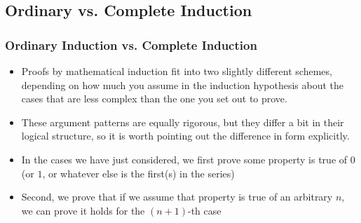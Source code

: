 \subsection{Ordinary vs. Complete Induction}


 \begin{frame}
\frametitle{Ordinary Induction vs. Complete Induction}

\begin{itemize}[<+->]
\item Proofs by mathematical induction fit into two slightly different schemes, depending on 
how much you assume in the induction hypothesis about the cases that are less complex than the one you set out to prove.

\item These argument patterns are equally rigorous, but they differ a bit in their logical structure, so it is worth pointing out the difference in form explicitly.

\item  In the cases we have just considered, we first prove some property is true of $0$ (or $1$, or whatever else is the first(s) in the series)

\item Second, we prove that if we assume that property is true of an arbitrary $n$,
we can prove it holds for the $(n + 1)$-th case %

\end{itemize} 
\end{frame}

